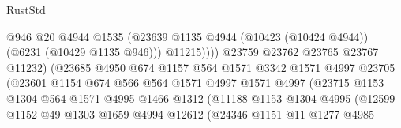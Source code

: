\begin{lexlean}{RustStd}
\begin{coremodule}
{{                                          @946
                                          @20
                                          @4944
                                          @1535
                                          (@23639
                                            @1135
                                            @4944
                                            (@10423 (@10424 @4944))
                                            (@6231 (@10429 @1135 @946)))
                                          @11215))))
                                  @23759
                                  @23762
                                  @23765
                                  @23767
                                  @11232)
                                (@23685
                                  @4950
                                  @674
                                  @1157
                                  @564
                                  @1571
                                  @3342
                                  @1571
                                  @4997
                                  @23705
                                  (@23601
                                    @1154
                                    @674
                                    @566
                                    @564
                                    @1571
                                    @4997
                                    @1571
                                    @4997
                                    (@23715
                                      @1153
                                      @1304
                                      @564
                                      @1571
                                      @4995
                                      @1466
                                      @1312
                                      (@11188
                                        @1153
                                        @1304
                                        @4995
                                        (@12599
                                          @1152
                                          @49
                                          @1303
                                          @1659
                                          @4994
                                          @12612
                                          (@24346
                                            @1151
                                            @11
                                            @1277
                                            @4985
}}
\end{coremodule}
\end{lexlean}
